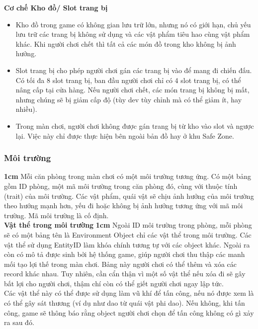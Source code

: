 \textbf{Cơ chế Kho đồ/ Slot trang bị}
\begin{itemize}
	\item Kho đồ trong game có không gian lưu trữ lớn, nhưng nó có giới hạn, chủ yếu lưu trữ các trang bị không sử dụng và các vật phẩm tiêu hao cùng vật phẩm khác. Khi người chơi chết thì tất cả các món đồ trong kho không bị ảnh hưởng.
	\item Slot trang bị cho phép người chơi gán các trang bị vào để mang đi chiến đấu. Có tối đa 8 slot trang bị, ban đầu người chơi chỉ có 4 slot trang bị, có thể nâng cấp tại cửa hàng. Nếu người chơi chết, các món trang bị không bị mất, nhưng chúng sẽ bị giảm cấp độ (tùy dev tùy chỉnh mà có thể giảm ít, hay nhiều).
	\item Trong màn chơi, người chơi không được gán trang bị từ kho vào slot và ngược lại. Việc này chỉ được thực hiện bên ngoài bản đồ hay ở khu Safe Zone.
\end{itemize}
\subsubsection{Môi trường}
\textbf{1cm} Mỗi căn phòng trong màn chơi có một môi trường tương ứng. Có một bảng gồm ID phòng, một mã môi trường trong căn phòng đó, cùng với thuộc tính (trait) của môi trường. Các vật phẩm, quái vật sẽ chịu ảnh hưởng của môi trường theo hướng mạnh hơn, yếu đi hoặc không bị ảnh hưởng tương ứng với mã môi trường. Mã môi trường là cố định.\\

\textbf{Vật thể trong môi trường}
\textbf{1cm} Ngoài ID môi trường trong phòng, mỗi phòng sẽ có một bảng tên là Environment Object chỉ các vật thể trong môi trường. Các vật thể sử dụng EntityID làm khóa chính tương tự với các object khác. Ngoài ra còn có mô tả được sinh bởi hệ thống game, giúp người chơi thu thập các manh mối tạo lợi thế trong màn chơi. Bảng này người chơi có thể thêm và xóa các record khác nhau. Tuy nhiên, cần cẩn thận vì một số vật thể nếu xóa đi sẽ gây bất lợi cho người chơi, thậm chí còn có thể giết người chơi ngay lập tức.\\

\hspace*{1cm} Các vật thể này có thể được sử dụng làm vũ khí để tấn công, nếu nó được xem là có thể gây sát thương (ví dụ như dao từ quái vật phi dao). Nếu không, khi tấn công, game sẽ thông báo rằng object người chơi chọn để tấn công không có gì xảy ra sau đó.\\

